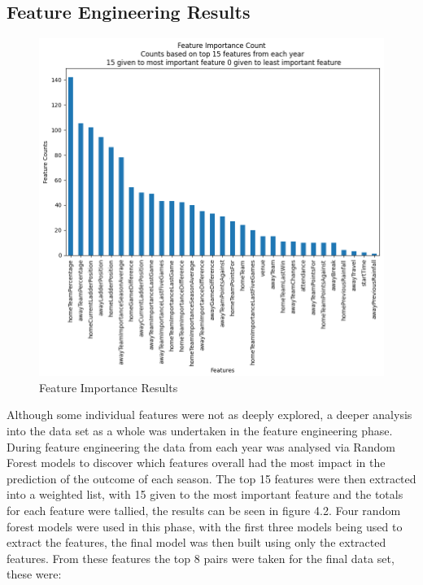 \documentclass{imc-inf}
\begin{document}
	\subsection{Feature Engineering Results}
	\begin{figure}
		\caption{Feature Importance Results}
		\includegraphics[width=15cm]{media/FeatureImportance.png}
	\end{figure}
	Although some individual features were not as deeply explored, a deeper analysis into the data set as a whole was undertaken in the feature engineering phase. During feature engineering the data from each year was analysed via Random Forest models to discover which features overall had the most impact in the prediction of the outcome of each season. The top 15 features were then extracted into a weighted list, with 15 given to the most important feature and the totals for each feature were tallied, the results can be seen in figure 4.2. Four random forest models were used in this phase, with the first three models being used to extract the features, the final model was then built using only the extracted features. From these features the top 8 pairs were taken for the final data set, these were:
\end{document}
